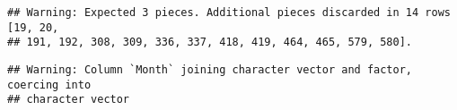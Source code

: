 \documentclass[]{book}
\newenvironment{Shaded}{\begin{snugshade}}{\end{snugshade}}
\newcommand{\DataTypeTok}[1]{\textcolor[rgb]{0.13,0.29,0.53}{#1}}
\newcommand{\KeywordTok}[1]{\textcolor[rgb]{0.13,0.29,0.53}{\textbf{#1}}}
\newcommand{\NormalTok}[1]{#1}
\newcommand{\OperatorTok}[1]{\textcolor[rgb]{0.81,0.36,0.00}{\textbf{#1}}}
\newcommand{\StringTok}[1]{\textcolor[rgb]{0.31,0.60,0.02}{#1}}
\begin{document}
\begin{verbatim}
## Warning: Expected 3 pieces. Additional pieces discarded in 14 rows [19, 20,
## 191, 192, 308, 309, 336, 337, 418, 419, 464, 465, 579, 580].
\end{verbatim}

\begin{Shaded}
\end{Shaded}

\begin{verbatim}
## Warning: Column `Month` joining character vector and factor, coercing into
## character vector
\end{verbatim}
\end{document}
